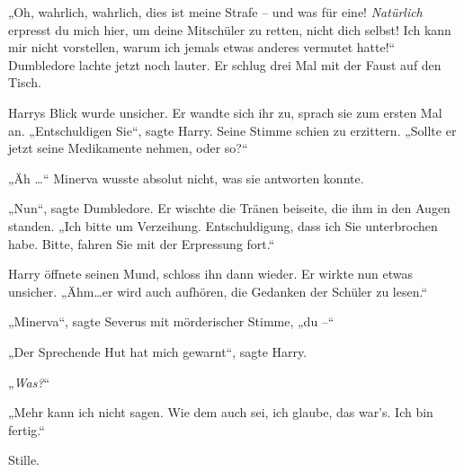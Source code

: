 „Oh, wahrlich, wahrlich, dies ist meine Strafe – und was für eine! \emph{Natürlich} erpresst du mich hier, um deine Mitschüler zu retten, nicht dich selbst! Ich kann mir nicht vorstellen, warum ich jemals etwas anderes vermutet hatte!“ Dumbledore lachte jetzt noch lauter. Er schlug drei Mal mit der Faust auf den Tisch.

Harrys Blick wurde unsicher. Er wandte sich ihr zu, sprach sie zum ersten Mal an. „Entschuldigen Sie“, sagte Harry. Seine Stimme schien zu erzittern. „Sollte er jetzt seine Medikamente nehmen, oder so?“

„Äh …“ Minerva wusste absolut nicht, was sie antworten konnte.

„Nun“, sagte Dumbledore. Er wischte die Tränen beiseite, die ihm in den Augen standen. „Ich bitte um Verzeihung. Entschuldigung, dass ich Sie unterbrochen habe. Bitte, fahren Sie mit der Erpressung fort.“

Harry öffnete seinen Mund, schloss ihn dann wieder. Er wirkte nun etwas unsicher. „Ähm…er wird auch aufhören, die Gedanken der Schüler zu lesen.“

„Minerva“, sagte Severus mit mörderischer Stimme, „du –“

„Der Sprechende Hut hat mich gewarnt“, sagte Harry.

„\emph{Was?}“

„Mehr kann ich nicht sagen. Wie dem auch sei, ich glaube, das war’s. Ich bin fertig.“

Stille.

